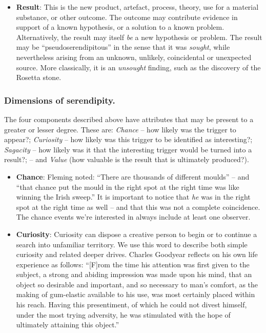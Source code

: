 \begin{itemize}
\item \textbf{Result}: This is the new product, artefact, process,
  theory, use for a material substance, or other outcome.  The
  outcome may contribute evidence in support of a known hypothesis, or
  a solution to a known problem.  Alternatively, the result may itself
  {\em be} a new hypothesis or problem.  The result may be
  ``pseudoserendipitous'' in the sense that it was {\em sought}, while
  nevertheless arising from an unknown, unlikely, coincidental or
  unexpected source.  More classically, it is an \emph{unsought}
  finding, such as the discovery of the Rosetta stone.
\end{itemize}

\subsubsection{Dimensions of serendipity.}

The four components described above have attributes that may be present to a greater or lesser degree.  These are: \emph{Chance} -- how likely was the trigger to appear?; \emph{Curiosity} -- how likely was this trigger to be identified as interesting?; \emph{Sagacity} -- how likely was it that the interesting trigger would be turned into a result?; -- and \emph{Value} (how valuable is the result that is ultimately produced?).

\begin{itemize}
\item \textbf{Chance}: Fleming \citeyear{fleming} noted: ``There are
  thousands of different moulds'' -- and ``that chance put the mould
  in the right spot at the right time was like winning the Irish
  sweep.''  It is important to notice that \emph{he} was in the right
  spot at the right time as well -- and that this was not a complete
  coincidence.  The chance events we're interested in always include
  at least one observer.
\end{itemize}

\begin{itemize}
\item \textbf{Curiosity}: Curiosity can dispose a creative person to
  begin or to continue a search into unfamiliar territory.  We use
  this word to describe both simple curiosity and related deeper
  drives.  Charles Goodyear \citeyear{goodyear1855gum} reflects on his
  own life experience as follows: ``[F]rom the time his attention was first given
  to the subject, a strong and abiding impression was made upon his
  mind, that an object so desirable and important, and so necessary to
  man's comfort, as the making of gum-elastic available to his use,
  was most certainly placed within his reach.  Having this
  presentiment, of which he could not divest himself, under the most
  trying adversity, he was stimulated with the hope of ultimately
  attaining this object.''
\end{itemize}

